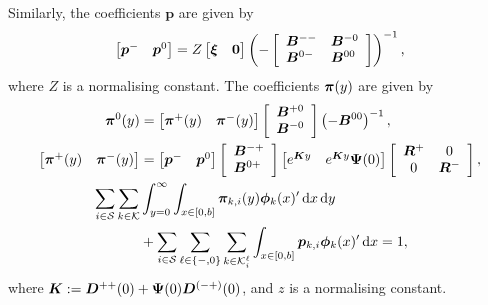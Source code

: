 Similarly, the coefficients \( {\boldsymbol{p}}\) are given by 
	\begin{equation}\begin{bmatrix} \boldsymbol{p}^{-}  & \boldsymbol{p}^{0} \end{bmatrix} = Z \begin{bmatrix} {\boldsymbol\xi} & \boldsymbol{0} \end{bmatrix} 
	\left(-\left[\begin{array}{ll} 
		{\boldsymbol B}^{--} & {\boldsymbol B}^{-0} \\
		{\boldsymbol B}^{0-} & {\boldsymbol B}^{00} 
		\end{array} \right] \right)^{-1},\label{eqn:pisystem1}\end{equation}
		where \(Z\) is a normalising constant. The coefficients \(\boldsymbol \pi(y)\) are given by 
\begin{align} 
	\;  {\boldsymbol{\pi}}^{0}(y) &= \begin{bmatrix}  {\boldsymbol{\pi}}^{+}(y) &  {\boldsymbol{\pi}}^{-}(y) \end{bmatrix}\left[\begin{array}{l} { {\boldsymbol B}}^{+0} \\ { {\boldsymbol B}}^{-0} \end{array} \right]\left(-{ {\boldsymbol B}}^{00}\right)^{-1}, \\ 
	 \begin{bmatrix}  {\boldsymbol{\pi}}^{+}(y) &  {\boldsymbol{\pi}}^{-}(y) \end{bmatrix}& = \begin{bmatrix}  {\boldsymbol{p}}^{-} &  {\boldsymbol{p}}^{0} \end{bmatrix}\left[\begin{array}{l} { {\boldsymbol B}}^{-+} \\ { {\boldsymbol B}}^{0+} \end{array} \right]\begin{bmatrix} e^{ {\boldsymbol K}y} & e^{ {\boldsymbol K}y}\boldsymbol \Psi(0) \end{bmatrix}\left[\begin{array}{cc}  {\boldsymbol R}^{+} & 0 \\ 0 &  {\boldsymbol R}^{-}\end{array}\right], \\
	 \sum_{i \in \mathcal{S}}\sum_{k \in \mathcal K} & \int_{y = 0}^{\infty} \int_{x \in [0,b]}  \boldsymbol \pi_{k,i}(y)\boldsymbol\phi_k(x)'{}\, \mathrm{d} x\, \mathrm{d} y 
	 \\&{}+  \sum_{i \in \mathcal{S}}\sum_{\ell \in \{-,0\}}\sum_{k\in \mathcal K_i^\ell}  \int_{x \in [0,b]}  \boldsymbol p_{k,i}\boldsymbol\phi_k(x)'{}\, \mathrm{d} x = 1,\label{eqn:pisystem2}
	\end{align}
	where $ {\boldsymbol K} :=  {\boldsymbol D}^{++}(0) + \boldsymbol \Psi(0) {\boldsymbol D}^{(-+)}(0)$, and $z$ is a normalising constant.

